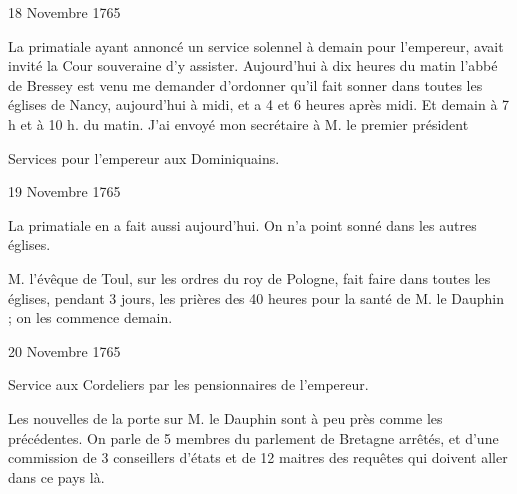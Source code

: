                      \begin{diary}{18 Novembre 1765}{}
                        
                        
                           La primatiale
                           ayant annoncé un service solennel
                           à demain pour l'empereur, avait invité la
                              Cour souveraine d'y assister. Aujourd'hui à dix
                           heures du matin l'abbé de
                              Bressey est venu
                           me demander d'ordonner qu'il fait sonner
                           dans toutes les églises de Nancy, aujourd'hui
                           à midi, et a 4 et 6 heures après midi. Et
                              demain à 7 h et à 10 h. du matin. J'ai
                           envoyé mon
                              secrétaire à M. le premier président
                        \bigskip
        
        
                         Services pour l'empereur aux Dominiquains. \bigskip
        
        
                     \end{diary}

                     \begin{diary}{19 Novembre 1765}{}
                        
                        
                           La primatiale en a fait
                           aussi aujourd'hui.
                           On n'a point sonné dans les autres églises. \bigskip
        
        
                        
                           M. l'évêque de Toul, sur les ordres
                           du roy
                              de Pologne, fait faire dans toutes les églises,
                           pendant 3 jours, les prières des 40 heures
                           pour la santé de M. le
                              Dauphin ; on les
                           commence demain. \bigskip
        
        
                     \end{diary}

                     \begin{diary}{20 Novembre 1765}{}
                        
                         Service aux Cordeliers par les pensionnaires
                           de l'empereur. \bigskip
        
        
                         Les nouvelles de la porte sur
                              M. le Dauphin
                           sont à peu près comme les précédentes.
                           On parle de 5 membres du parlement
                              de
                              Bretagne
                           arrêtés, et d'une commission de
                           3 conseillers d'états et de 12 maitres des
                           requêtes qui doivent aller dans ce pays là. \bigskip
        
        
                     \end{diary}
                     
